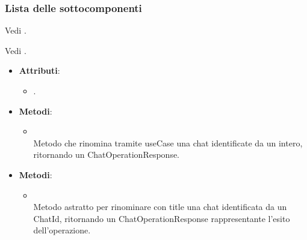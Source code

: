 \documentclass[10pt, a4paper]{article}
\begin{document}
\subsubsection{Lista delle sottocomponenti}

Vedi .

Vedi .

\label{RenameChatControllerDettaglio}
\begin{itemize}
    \item \textbf{Attributi}:
    \begin{itemize}
        \item {}.
    \end{itemize}
    \item \textbf{Metodi}:
    \begin{itemize}
        \item {}\\
        Metodo che rinomina tramite useCase una chat identificate da un intero, ritornando un ChatOperationResponse.
    \end{itemize}
\end{itemize}


\label{RenameChatPortDettaglio}
\begin{itemize}
    \item \textbf{Metodi}:
    \begin{itemize}
        \item {}\\
        Metodo astratto per rinominare con title una chat identificata da un ChatId, ritornando un ChatOperationResponse rappresentante l'esito dell'operazione.
    \end{itemize}
\end{itemize}
\end{document}

